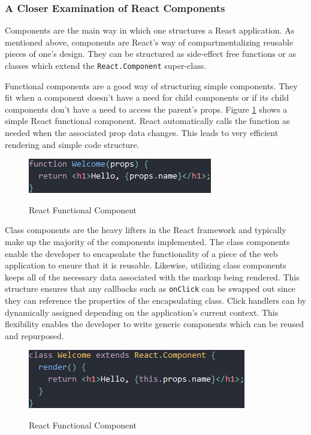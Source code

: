 \documentclass[12pt]{report}
\begin{document}
\subsubsection*{A Closer Examination of React Components}

Components are the main way in which one structures a React application. As mentioned above, components are React's way of compartmentalizing reusable pieces of one's design. They can be structured as side-effect free functions or as classes which extend the \texttt{React.Component} super-class.

Functional components are a good way of structuring simple components. They fit when a component doesn't have a need for child components or if its child components don't have a need to access the parent's props. Figure \ref{fig:reactfunctionalcomponent} shows a simple React functional component.\cite{reactcomponentsandprops} React automatically calls the function as needed when the associated prop data changes. This leads to very efficient rendering and simple code structure.

\begin{figure}[h]
	\centering
	\caption{React Functional Component}
	\includegraphics[scale=0.5]{react_functional_component}
	\label{fig:reactfunctionalcomponent}
\end{figure}

Class components are the heavy lifters in the React framework and typically make up the majority of the components implemented. The class components enable the developer to encapsulate the functionality of a piece of the web application to ensure that it is reusable. Likewise, utilizing class components keeps all of the necessary data associated with the markup being rendered. This structure ensures that any callbacks such as \texttt{onClick} can be swapped out since they can reference the properties of the encapsulating class. Click handlers can by dynamically assigned depending on the application's current context. This flexibility enables the developer to write generic components which can be reused and repurposed.

\begin{figure}[h]
	\centering
	\caption{React Functional Component}
	\includegraphics[scale=0.5]{react_class_component}
	\label{fig:reactclasscomponent}
\end{figure}
\end{document}

